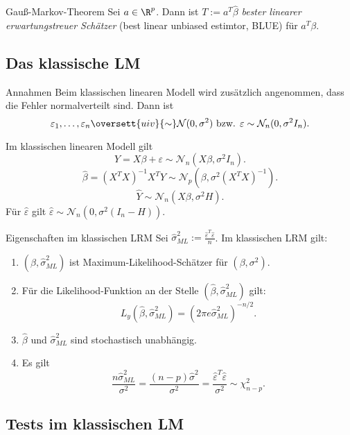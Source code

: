 \begin{karte}{Gauß-Markov-Theorem}
Sei \(a\in \R^p\). Dann ist \(T := a^T \hat{\beta}\) \textit{bester linearer erwartungstreuer Schätzer} 
(best linear unbiased estimtor, BLUE) für \(a^T \beta\).
\end{karte}

\subsection{Das klassische LM}

\begin{karte}{Annahmen}
Beim klassischen linearen Modell wird zusätzlich angenommen, dass die Fehler normalverteilt sind. 
Dann ist 
\[ \varepsilon_1, \ldots, \varepsilon_n \oversett{uiv}{\sim} \mathcal{N}(0, \sigma^2) \text{ bzw. } \varepsilon \sim \mathcal{N}_n(0, \sigma^2 I_n). \]

Im klassischen linearen Modell gilt 
\[ Y = X \beta + \varepsilon \sim \mathcal{N}_n(X \beta, \sigma^2 I_n). \]
\[ \hat{\beta} = (X^T X)^{-1} X^T Y \sim \mathcal{N}_p(\beta, \sigma^2 (X^T X)^{-1}). \]
\[ \hat{Y} \sim \mathcal{N}_n(X\beta, \sigma^2 H). \]
Für \(\hat{\varepsilon}\) gilt \(\hat{\varepsilon} \sim \mathcal{N}_n(0, \sigma^2(I_n - H))\).
\end{karte}

\begin{karte}{Eigenschaften im klassischen LRM}
Sei \(\hat{\sigma}_{ML}^2 := \frac{\hat{\varepsilon}^T \hat{\varepsilon}}{n}\). Im klassischen LRM gilt: 
\begin{enumerate}
    \item \((\hat{\beta}, \hat{\sigma}_{ML}^2)\) ist Maximum-Likelihood-Schätzer für \((\beta, \sigma^2)\).
    \item Für die Likelihood-Funktion an der Stelle \((\hat{\beta}, \hat{\sigma}_{ML}^2)\) gilt: 
    \[ L_y(\hat{\beta}, \hat{\sigma}_{ML}^2) = (2\pi e \hat{\sigma}_{ML}^2)^{-n/2}. \]
    \item \(\hat{\beta}\) und \(\hat{\sigma}_{ML}^2\) sind stochastisch unabhängig.
    \item Es gilt 
    \[ \frac{n \hat{\sigma}_{ML}^2}{\sigma^2} = \frac{(n-p)\hat{\sigma}^2}{\sigma^2} = \frac{\hat{\varepsilon}^T \hat{\varepsilon}}{\sigma^2} \sim \chi_{n-p}^2. \]
\end{enumerate}
\end{karte}

\subsection{Tests im klassischen LM}

